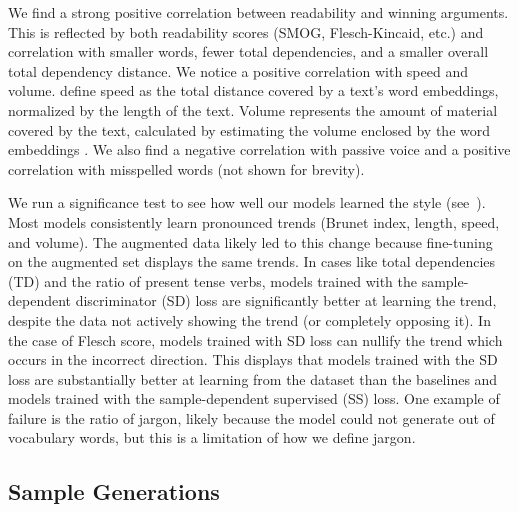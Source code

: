 We find a strong positive correlation between readability and winning arguments. This is reflected by both readability scores (\eg SMOG, Flesch-Kincaid, etc.) and correlation with smaller words, fewer total dependencies, and a smaller overall total dependency distance. We notice a positive correlation with speed and volume. \citet{toubia-2021} define speed as the total distance covered by a text's word embeddings, normalized by the length of the text. Volume represents the amount of material covered by the text, calculated by estimating the volume enclosed by the word embeddings \citep{toubia-2021}. We also find a negative correlation with passive voice and a positive correlation with misspelled words (not shown for brevity).

We run a significance test to see how well our models learned the style (see~). Most models consistently learn pronounced trends (\ie Brunet index, length, speed, and volume). The augmented data likely led to this change because fine-tuning on the augmented set displays the same trends. In cases like total dependencies (TD) and the ratio of present tense verbs, models trained with the sample-dependent discriminator (SD) loss are significantly better at learning the trend, despite the data not actively showing the trend (or completely opposing it). In the case of Flesch score, models trained with SD loss can nullify the trend which occurs in the incorrect direction. This displays that models trained with the SD loss are substantially better at learning from the dataset than the baselines and models trained with the sample-dependent supervised (SS) loss. One example of failure is the ratio of jargon, likely because the model could not generate out of vocabulary words, but this is a limitation of how we define jargon.



\subsection{Sample Generations}
\label{subsec:si_pers_sample}




